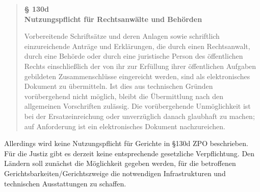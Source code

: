 \begin{quote}
	\begin{center}
		\textbf{§ 130d} \\
		\textbf{Nutzungspflicht für Rechtsanwälte und Behörden}
	\end{center}
	Vorbereitende Schriftsätze und deren Anlagen sowie schriftlich einzureichende Anträge und Erklärungen, die durch einen Rechtsanwalt, durch eine Behörde oder durch eine juristische Person des öffentlichen Rechts einschließlich der von ihr zur Erfüllung ihrer öffentlichen Aufgaben gebildeten Zusammenschlüsse eingereicht werden, sind als elektronisches Dokument zu übermitteln. Ist dies aus technischen Gründen vorübergehend nicht möglich, bleibt die Übermittlung nach den allgemeinen Vorschriften zulässig. Die vorübergehende Unmöglichkeit ist bei der Ersatzeinreichung oder unverzüglich danach glaubhaft zu machen; auf Anforderung ist ein elektronisches Dokument nachzureichen.
\end{quote}

Allerdings wird keine Nutzungspflicht für Gerichte in §130d ZPO \textcite{bea:bea:zpo130} beschrieben. Für die Justiz gibt es derzeit keine entsprechende gesetzliche Verpflichtung. Den Ländern soll zunächst die Möglichkeit gegeben werden, für die betroffenen Gerichtsbarkeiten/Gerichtszweige die notwendigen Infrastrukturen und technischen Ausstattungen zu schaffen.

